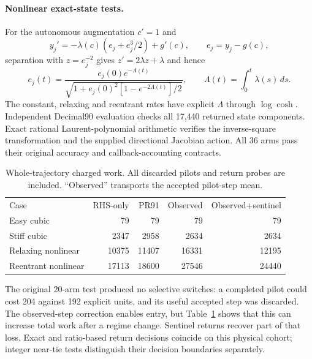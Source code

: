 \paragraph{Nonlinear exact-state tests.}
For the autonomous augmentation $c'=1$ and
\begin{equation}
 y_j'=-\lambda(c)(e_j+e_j^3/2)+g'(c),\qquad e_j=y_j-g(c),
\end{equation}
separation with $z=e_j^{-2}$ gives $z'=2\lambda z+\lambda$ and hence
\begin{equation}
 e_j(t)=\frac{e_j(0)e^{-\Lambda(t)}}{
 \sqrt{1+e_j(0)^2[1-e^{-2\Lambda(t)}]/2}},\qquad
 \Lambda(t)=\int_0^t\lambda(s)\,ds.
\end{equation}
The constant, relaxing and reentrant rates have explicit $\Lambda$ through
$\log\cosh$. Independent Decimal90 evaluation checks all 17,440 returned
state components. Exact rational Laurent-polynomial arithmetic verifies the
inverse-square transformation and the supplied directional Jacobian action.
All 36 arms pass their original accuracy and callback-accounting contracts.

\begin{table}[tb]
\caption{Whole-trajectory charged work. All discarded pilots and return
probes are included. ``Observed'' transports the accepted pilot-step mean.}
\label{tab:production-adapter-work}
\begin{ruledtabular}
\begin{tabular}{lrrrr}
Case & RHS-only & PR91 & Observed & Observed+sentinel\\
Easy cubic &79&79&79&79\\
Stiff cubic &2347&2958&2634&2634\\
Relaxing nonlinear &10375&11407&16331&12195\\
Reentrant nonlinear &17113&18600&27546&24440
\end{tabular}
\end{ruledtabular}
\end{table}

The original 20-arm test produced no selective switches: a completed pilot
could cost 204 against 192 explicit units, and its useful accepted step was
discarded. The observed-step correction enables entry, but Table~\ref{tab:production-adapter-work}
shows that this can increase total work after a regime change. Sentinel
returns recover part of that loss. Exact and ratio-based return decisions
coincide on this physical cohort; integer near-tie tests distinguish their
decision boundaries separately.

